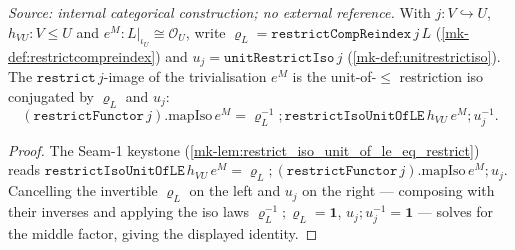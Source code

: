 \begin{lemma}\label{mk-lem:trivialisation_em_leg}
  \leanok

  \textit{Source: internal categorical construction; no external reference.}
  With \(j : V \hookrightarrow U\), \(h_{VU} : V \le U\) and \(e^M : L|_{\iota_U} \cong \mathcal O_U\),
  write \(\varrho_L = \mathtt{restrictCompReindex}\,j\,L\) (\ref{mk-def:restrictcompreindex}) and
  \(u_j = \mathtt{unitRestrictIso}\,j\) (\ref{mk-def:unitrestrictiso}). The \(\mathtt{restrict}\,j\)-image of
  the trivialisation \(e^M\) is the unit-of-\(\le\) restriction iso conjugated by \(\varrho_L\) and
  \(u_j\):
  \[
    (\mathtt{restrictFunctor}\,j).\mathrm{mapIso}\,e^M
      = \varrho_L^{-1} \mathbin{;} \mathtt{restrictIsoUnitOfLE}\,h_{VU}\,e^M \mathbin{;} u_j^{-1}.
  \]
\end{lemma}
\begin{proof}
  \leanok
  The Seam-1 keystone (\ref{mk-lem:restrict_iso_unit_of_le_eq_restrict}) reads
  \(\mathtt{restrictIsoUnitOfLE}\,h_{VU}\,e^M
    = \varrho_L \mathbin{;} (\mathtt{restrictFunctor}\,j).\mathrm{mapIso}\,e^M \mathbin{;} u_j\).
  Cancelling the invertible \(\varrho_L\) on the left and \(u_j\) on the right --- composing with their
  inverses and applying the iso laws \(\varrho_L^{-1} \mathbin{;} \varrho_L = \mathbf 1\),
  \(u_j \mathbin{;} u_j^{-1} = \mathbf 1\) --- solves for the middle factor, giving the displayed identity.
\end{proof}

